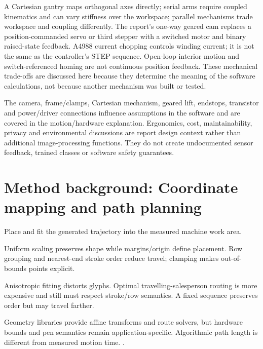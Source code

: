 A Cartesian gantry maps orthogonal axes directly; serial arms require coupled
kinematics and can vary stiffness over the workspace; parallel mechanisms
trade workspace and coupling differently. The report's one-way geared cam
replaces a position-commanded servo or third stepper with a switched motor and
binary raised-state feedback. A4988 current chopping controls winding current;
it is not the same as the controller's STEP sequence. Open-loop interior motion
and switch-referenced homing are not continuous position feedback. These
mechanical trade-offs are discussed here because they determine the meaning of
the software calculations, not because another mechanism was built or tested.

The camera, frame/clamps, Cartesian mechanism, geared lift, endstops, transistor
and power/driver connections influence assumptions in the software and are
covered in the motion/hardware explanation. Ergonomics, cost, maintainability,
privacy and environmental discussions are report design context rather than
additional image-processing functions. They do not create undocumented
sensor feedback, trained classes or software safety guarantees.

\section{Method background: Coordinate mapping and path planning}\label{method:motion}
Place and fit the generated trajectory into the measured machine work area.


Uniform scaling preserves shape while margins/origin define placement. Row grouping and nearest-end stroke order reduce travel; clamping makes out-of-bounds points explicit.


Anisotropic fitting distorts glyphs. Optimal travelling-salesperson routing is more expensive and still must respect stroke/row semantics. A fixed sequence preserves order but may travel farther.


Geometry libraries provide affine transforms and route solvers, but hardware bounds and pen semantics remain application-specific. Algorithmic path length is different from measured motion time. \cite{bresenham1965,code2026}.


